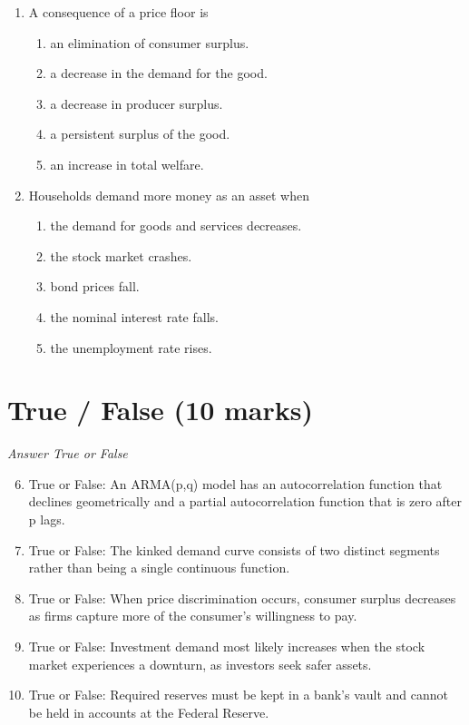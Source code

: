 \documentclass[12pt]{article}
\begin{document}
\begin{enumerate}[label=\arabic*.]
\item A consequence of a price floor is
\begin{enumerate}[label=(\alph*)]
    \item an elimination of consumer surplus.
    \item a decrease in the demand for the good.
    \item a decrease in producer surplus.
    \item a persistent surplus of the good.
    \item an increase in total welfare.
\end{enumerate}
\item Households demand more money as an asset when
\begin{enumerate}[label=(\alph*)]
    \item the demand for goods and services decreases.
    \item the stock market crashes.
    \item bond prices fall.
    \item the nominal interest rate falls.
    \item the unemployment rate rises.
\end{enumerate}
\end{enumerate}

\section*{True / False (10 marks)}
\textit{Answer True or False}
\begin{enumerate}[label=\arabic*.]
\setcounter{enumi}{5}
\item True or False: An ARMA(p,q) model has an autocorrelation function that declines geometrically and a partial autocorrelation function that is zero after p lags.
\item True or False: The kinked demand curve consists of two distinct segments rather than being a single continuous function.
\item True or False: When price discrimination occurs, consumer surplus decreases as firms capture more of the consumer's willingness to pay.
\item True or False: Investment demand most likely increases when the stock market experiences a downturn, as investors seek safer assets.
\item True or False: Required reserves must be kept in a bank's vault and cannot be held in accounts at the Federal Reserve.
\end{enumerate}
\end{document}
